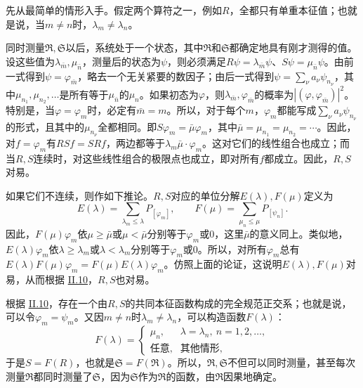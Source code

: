 \documentclass[fontsize=13pt,twoside,openany,headings=normal,parskip=false,bookmarkpackage=false,DIV=calc]{scrbook}
\begin{document}
先从最简单的情形入手。假定两个算符之一，例如$R$，全都只有单重本征值；也就是说，当$m\ne n$时，$\lambda_m\ne\lambda_n$。

同时测量$\mathfrak R,\allowbreak \mathfrak S$以后，系统处于一个状态，其中$\mathfrak R$和$\mathfrak S$都确定地具有刚才测得的值。设这些值为$\lambda_{\bar m},\allowbreak \mu_{\bar n}$，测量后的状态为$\psi$，则必须满足$R\psi=\lambda_{\bar m}\psi$、$S\psi=\mu_{\bar n}\psi$。由前一式得到$\psi=\varphi_{\bar m}$，略去一个无关紧要的数因子；由后一式得到$\psi=\sum_\nu a_\nu\psi_{n_\nu}$，其中$\mu_{n_1},\allowbreak \mu_{n_2},\allowbreak \ldots$是所有等于$\mu_{\bar n}$的$\mu_n$。如果初态为$\varphi$，则$\lambda_{\bar m},\allowbreak \varphi_{\bar m}$的概率为$|(\varphi,\allowbreak \varphi_{\bar m})|^2$。特别是，当$\varphi=\varphi_m$时，必定有$\bar m=m$。所以，对于每个$m$，$\varphi_m$都能写成$\sum_\nu a_\nu\psi_{n_\nu}$的形式，且其中的$\mu_{n_\nu}$全都相同。即$S\varphi_m=\bar\mu\varphi_m$，其中$\bar\mu=\mu_{n_1}=\mu_{n_2}=\cdots$。因此，对$f=\varphi_m$有$RSf=SRf$，两边都等于$\lambda_m\bar\mu\cdot\varphi_m$。这对它们的线性组合也成立；而当$R,\allowbreak S$连续时，对这些线性组合的极限点也成立，即对所有$f$都成立。因此，$R,\allowbreak S$对易。

\hypertarget{origpage-118}{}\label{origpage-118}如果它们不连续，则作如下推论。$R,\allowbreak S$对应的单位分解$E(\lambda),\allowbreak F(\mu)$定义为
\[
E(\lambda)=\sum_{\lambda_m\le\lambda}P_{[\varphi_m]},\qquad
F(\mu)=\sum_{\mu_n\le\mu}P_{[\psi_n]}.
\]
因此，$F(\mu)\varphi_m$依$\mu\ge\bar\mu$或$\mu<\bar\mu$分别等于$\varphi_m$或$0$，这里$\bar\mu$的意义同上。类似地，$E(\lambda)\varphi_m$依$\lambda\ge\lambda_m$或$\lambda<\lambda_m$分别等于$\varphi_m$或$0$。所以，对所有$\varphi_m$总有$E(\lambda)F(\mu)\varphi_m=F(\mu)E(\lambda)\varphi_m$。仿照上面的论证，这说明$E(\lambda),\allowbreak F(\mu)$对易，从而根据 \hyperref[sec:II.10]{II.10}，$R,\allowbreak S$也对易。

根据 \hyperref[sec:II.10]{II.10}，存在一个由$R,\allowbreak S$的共同本征函数构成的完全规范正交系；也就是说，可以令$\varphi_m=\psi_m$。又因$m\ne n$时$\lambda_m\ne\lambda_n$，可以构造函数$F(\lambda)$：
\[
F(\lambda)=\begin{cases}\mu_n,&\lambda=\lambda_n,\ n=1,2,\ldots,\\
\text{任意},&\text{其他情形},\end{cases}
\]
于是$S=F(R)$，也就是$\mathfrak S=F(\mathfrak R)$。所以，$\mathfrak R,\allowbreak \mathfrak S$不但可以同时测量，甚至每次测量$\mathfrak R$都同时测量了$\mathfrak S$，因为$\mathfrak S$作为$\mathfrak R$的函数，由$\mathfrak R$因果地确定。
\end{document}
